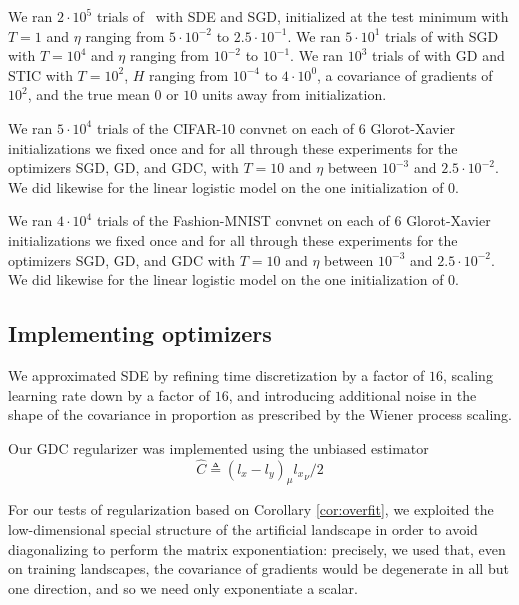                 We ran $2 \cdot 10^5$ trials of \Gauss\, with SDE and SGD,
                initialized at the test minimum with $T=1$ and $\eta$ ranging from
                $5\cdot 10^{-2}$ to $2.5\cdot 10^{-1}$.
                We ran $5 \cdot 10^1$ trials of \Helix with SGD with $T=10^4$
            and $\eta$ ranging from $10^{-2}$ to $10^{-1}$.
            We ran $10^3$ trials of \MeanEstimation with GD and STIC
            with $T=10^2$, $H$ ranging from $10^{-4}$ to $4 \cdot 10^0$,
            a covariance of gradients of $10^2$, and the true mean $0$ or
            $10$ units away from initialization.

            We ran $5 \cdot 10^4$ trials of the CIFAR-10 convnet on each of $6$
            Glorot-Xavier initializations we fixed once and for all through
            these experiments for the optimizers SGD, GD, and GDC, with $T=10$
            and $\eta$ between $10^{-3}$ and $2.5 \cdot 10^{-2}$.  We did
            likewise for the linear logistic model on the one initialization of
            $0$.

            We ran $4 \cdot 10^4$ trials of the Fashion-MNIST convnet on each
            of $6$ Glorot-Xavier initializations we fixed once and for all
            through these experiments for the optimizers SGD, GD, and GDC with
            $T=10$ and $\eta$ between $10^{-3}$ and $2.5 \cdot 10^{-2}$.  We
            did likewise for the linear logistic model on the one
            initialization of $0$. 

    \subsection{Implementing optimizers}                            \label{appendix:optimizers}

        We approximated SDE by refining time discretization by a factor of
        $16$, scaling learning rate down by a factor of $16$, and introducing
        additional noise in the shape of the covariance in proportion as
        prescribed by the Wiener process scaling.

        Our GDC regularizer was implemented using the unbiased estimator
        $$
            \hat{C} \triangleq (l_x - l_y)_\mu {l_x}_\nu / 2
        $$
        
        For our tests of regularization based on Corollary \ref{cor:overfit},
        we exploited the low-dimensional special structure of the artificial
        landscape in order to avoid diagonalizing to perform the matrix
        exponentiation: precisely, we used that, even on training landscapes,
        the covariance of gradients would be degenerate in all but one
        direction, and so we need only exponentiate a scalar.

